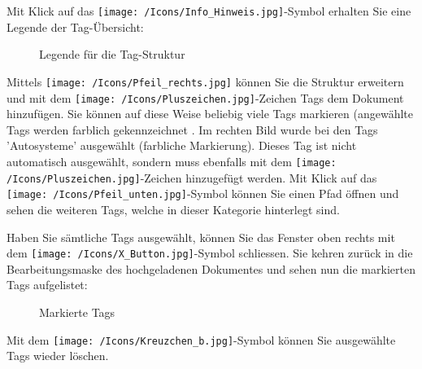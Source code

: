 Mit Klick auf das \texttt{[image: /Icons/Info\_Hinweis.jpg]}-Symbol  erhalten Sie eine Legende der Tag-Übersicht:

\begin{figure}[H]
\caption{Legende für die Tag-Struktur}
\end{figure}

Mittels \texttt{[image: /Icons/Pfeil\_rechts.jpg]} können Sie die Struktur erweitern und mit dem \texttt{[image: /Icons/Pluszeichen.jpg]}-Zeichen  Tags dem Dokument hinzufügen. Sie können auf diese Weise beliebig viele Tags markieren (angewählte Tags werden farblich gekennzeichnet . Im rechten Bild wurde bei den Tags 'Autosysteme' ausgewählt  (farbliche Markierung). Dieses Tag ist nicht automatisch ausgewählt, sondern muss ebenfalls mit dem \texttt{[image: /Icons/Pluszeichen.jpg]}-Zeichen hinzugefügt werden. Mit Klick auf das \texttt{[image: /Icons/Pfeil\_unten.jpg]}-Symbol können Sie einen Pfad öffnen und sehen die weiteren Tags, welche in dieser Kategorie hinterlegt sind.  \newline

Haben Sie sämtliche Tags ausgewählt, können Sie das Fenster oben rechts mit dem \texttt{[image: /Icons/X\_Button.jpg]}-Symbol  schliessen. Sie kehren zurück in die Bearbeitungsmaske des hochgeladenen Dokumentes und sehen nun die markierten Tags aufgelistet:

\begin{figure}[H]
\caption{Markierte Tags}
\end{figure}

Mit dem \texttt{[image: /Icons/Kreuzchen\_b.jpg]}-Symbol  können Sie ausgewählte Tags wieder löschen.
 
